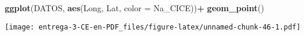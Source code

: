 \documentclass[
]{article}
\newenvironment{Shaded}{\begin{snugshade}}{\end{snugshade}}
\newcommand{\DataTypeTok}[1]{\textcolor[rgb]{0.13,0.29,0.53}{#1}}
\newcommand{\DecValTok}[1]{\textcolor[rgb]{0.00,0.00,0.81}{#1}}
\newcommand{\KeywordTok}[1]{\textcolor[rgb]{0.13,0.29,0.53}{\textbf{#1}}}
\newcommand{\NormalTok}[1]{#1}
\newcommand{\OperatorTok}[1]{\textcolor[rgb]{0.81,0.36,0.00}{\textbf{#1}}}
\newcommand{\StringTok}[1]{\textcolor[rgb]{0.31,0.60,0.02}{#1}}
\begin{document}
\begin{Shaded}
\begin{Highlighting}[]
\KeywordTok{ggplot}\NormalTok{(DATOS, }\KeywordTok{aes}\NormalTok{(Long, Lat, }\DataTypeTok{color =}\NormalTok{ Na_CICE))}\OperatorTok{+}
\StringTok{  }\KeywordTok{geom_point}\NormalTok{()}
\end{Highlighting}
\end{Shaded}

\texttt{[image: entrega-3-CE-en-PDF\_files/figure-latex/unnamed-chunk-46-1.pdf]}

\begin{Shaded}
\end{Shaded}
\end{document}
